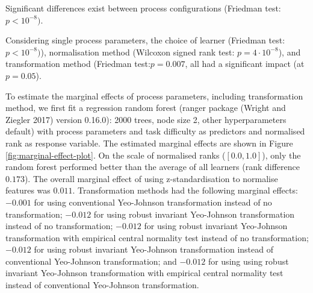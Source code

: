 \documentclass[
  a4paper,
]{article}
\begin{document}
Significant differences exist between process configurations (Friedman
test: \(p < 10^{-8})\).

Considering single process parameters, the choice of learner (Friedman
test: \(p < 10^{-8})\)), normalisation method (Wilcoxon signed rank
test: \(p = 4 \cdot 10^{-8}\)), and transformation method (Friedman
test:\(p = 0.007\), all had a significant impact (at \(p = 0.05\)).

To estimate the marginal effects of process parameters, including
transformation method, we first fit a regression random forest (ranger
package (Wright and Ziegler 2017) version 0.16.0): 2000 trees, node size
2, other hyperparameters default) with process parameters and task
difficulty as predictors and normalised rank as response variable. The
estimated marginal effects are shown in Figure
\ref{fig:marginal-effect-plot}. On the scale of normalised ranks
(\([0.0, 1.0]\)), only the random forest performed better than the
average of all learners (rank difference \(0.173\)). The overall
marginal effect of using z-standardisation to normalise features was
\(0.011\). Transformation methods had the following marginal effects:
\(-0.001\) for using conventional Yeo-Johnson transformation instead of
no transformation; \(-0.012\) for using robust invariant Yeo-Johnson
transformation instead of no transformation; \(-0.012\) for using robust
invariant Yeo-Johnson transformation with empirical central normality
test instead of no transformation; \(-0.012\) for using robust invariant
Yeo-Johnson transformation instead of conventional Yeo-Johnson
transformation; and \(-0.012\) for using using robust invariant
Yeo-Johnson transformation with empirical central normality test instead
of conventional Yeo-Johnson transformation.
\end{document}
